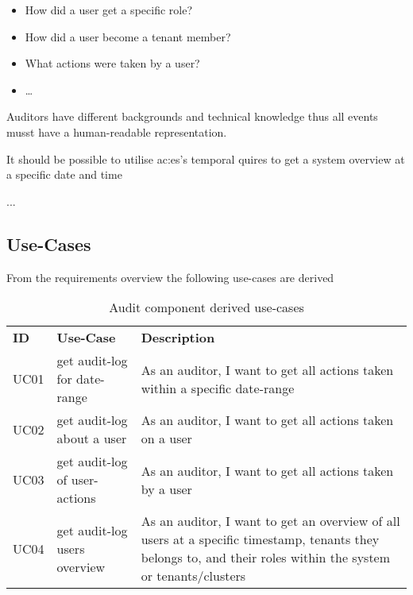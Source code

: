 \begin{itemize}
  \item How did a user get a specific role?
  \item How did a user become a tenant member?
  \item What actions were taken by a user?
  \item \dots
\end{itemize}

Auditors have different backgrounds and technical knowledge thus all events musst have a human-readable representation.

It should be possible to utilise \gls{ac:es}'s temporal quires  to get a system overview at a specific date and time 

...~\citep{SAIP}

\subsection{Use-Cases}

From the requirements overview the following use-cases are derived

\begin{table}[H]
  \begin{center}
    \caption{Audit component derived use-cases}
    \label{tab:acuc}
    \def\arraystretch{1.5}
    \begin{tabularx}{\linewidth}{|l l X |}
      \hline
      \rowcolor{gray!20}
      \textbf{ID} & \textbf{Use-Case} & \textbf{Description}\\
      UC01 & get audit-log for date-range & As an auditor, I want to get all actions taken within a specific date-range\\
      UC02 & get audit-log about a user & As an auditor, I want to get all actions taken on a user\\
      UC03 & get audit-log of user-actions & As an auditor, I want to get all actions taken by a user\\
      UC04 & get audit-log users overview & As an auditor, I want to get an overview of all users at a specific timestamp, tenants they belongs to, and their roles within the system or tenants/clusters\\
      \hline
    \end{tabularx}
  \end{center}
\end{table}


